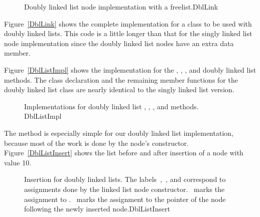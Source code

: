 \begin{figure}
\vspace{-\bigskipamount}\vspace{-\bigskipamount}
\vspace{-\medskipamount}

\end{figure}

\begin{figure}
\vspace{-\bigskipamount}

{Doubly linked list node implementation with
a freelist.}{DblLink}
\smallskip
\end{figure}

Figure~\ref{DblLink} shows the complete implementation for a
 class to be used with doubly linked lists.
This code is a little longer than that for the singly linked list node
implementation since
the doubly linked list nodes have an extra data member.

Figure~\ref{DblListImpl} shows the implementation for the
, ,
, and  doubly
linked list methods.
The class declaration and the remaining member functions for the
doubly linked list class are nearly identical to the singly linked
list version.

\begin{figure}
\vspace{-\medskipamount}

{Implementations for doubly linked list ,
, , and  methods.}
{DblListImpl}
\vspace{-\medskipamount}
\end{figure}

The  method is especially simple for our doubly linked
list implementation, because most of the work is done by the node's
constructor.
Figure~\ref{DblListInsert} shows the list before and after
insertion of a node with value 10.

\begin{figure}
\vspace{-\medskipamount}
{Insertion for doubly linked lists.
The labels \,, \,, and  correspond to
assignments done by the linked list node constructor.
~marks the assignment to .
~marks the assignment to the  pointer
of the node following the newly inserted node.}{DblListInsert}
\bigskip
\end{figure}

